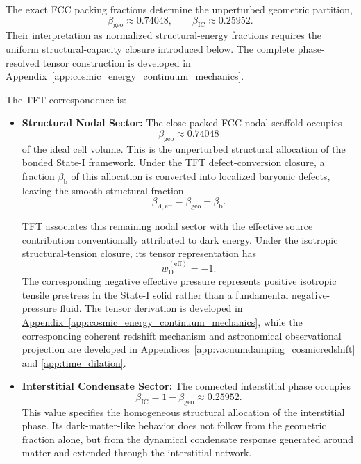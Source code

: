 The exact FCC packing fractions determine the unperturbed geometric partition,
\begin{equation}
    \beta_{\mathrm{geo}} \approx 0.74048, \qquad \beta_{\mathrm{IC}} \approx 0.25952.
\end{equation}
Their interpretation as normalized structural-energy fractions requires the uniform structural-capacity closure introduced below. The complete phase-resolved tensor construction is developed in \hyperref[app:cosmic_energy_continuum_mechanics]{Appendix~\ref*{app:cosmic_energy_continuum_mechanics}}.

The TFT correspondence is:

\begin{itemize}
    \item \textbf{Structural Nodal Sector:}
    The close-packed FCC nodal scaffold occupies
    \begin{equation}
        \beta_{\mathrm{geo}} \approx 0.74048
    \end{equation}
    of the ideal cell volume. This is the unperturbed structural allocation of the bonded State-I framework. Under the TFT defect-conversion closure, a fraction $\beta_{\mathrm{b}}$ of this allocation is converted into localized baryonic defects, leaving the smooth structural fraction
    \begin{equation}
        \beta_{\Lambda,\mathrm{eff}} = \beta_{\mathrm{geo}} - \beta_{\mathrm{b}}.
    \end{equation}

    TFT associates this remaining nodal sector with the effective source contribution conventionally attributed to dark energy. Under the isotropic structural-tension closure, its tensor representation has
    \begin{equation}
        w_{\mathrm{D}}^{(\mathrm{eff})} = -1.
    \end{equation}
    The corresponding negative effective pressure represents positive isotropic tensile prestress in the State-I solid rather than a fundamental negative-pressure fluid. The tensor derivation is developed in \hyperref[app:cosmic_energy_continuum_mechanics]{Appendix~\ref*{app:cosmic_energy_continuum_mechanics}}, while the corresponding coherent redshift mechanism and astronomical observational projection are developed in \hyperref[app:vacuumdamping_cosmicredshift]{Appendices~\ref*{app:vacuumdamping_cosmicredshift}} and \hyperref[app:time_dilation]{\ref*{app:time_dilation}}.
    
    \item \textbf{Interstitial Condensate Sector:}
    The connected interstitial phase occupies
    \begin{equation}
        \beta_{\mathrm{IC}} = 1-\beta_{\mathrm{geo}} \approx 0.25952.
    \end{equation}
    This value specifies the homogeneous structural allocation of the interstitial phase. Its dark-matter-like behavior does not follow from the geometric fraction alone, but from the dynamical condensate response generated around matter and extended through the interstitial network.


\end{itemize}
